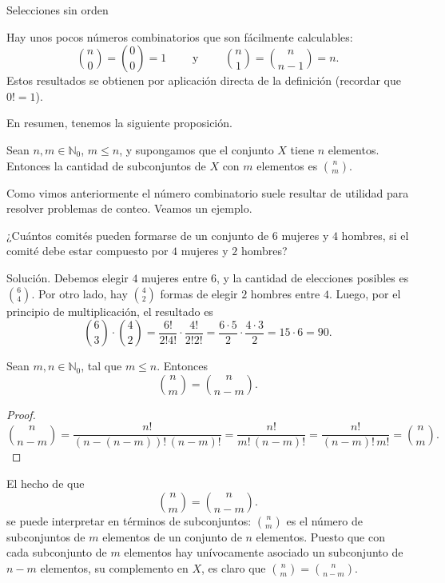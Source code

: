 \begin{section}{Selecciones sin orden}
\begin{observacion} Hay unos pocos números combinatorios que son fácilmente calculables: 
$$
\binom{n}{0} = \binom{0}{0} = 1 \qquad \text{ y }\qquad  \binom{n}{1} = \binom{n}{n-1} = n. 
$$
Estos resultados se obtienen por aplicación directa de la definición (recordar que  $0! =1$). 
\end{observacion}

En resumen, tenemos la siguiente proposición.

\begin{proposicion}
Sean $n, m \in \mathbb N_0$, $m \le n$, y supongamos que el conjunto $X$ tiene $n$ elementos.
Entonces la cantidad de subconjuntos de $X$ con $m$ elementos es
$
\displaystyle\binom{n}{m}
$.
\end{proposicion}

Como vimos anteriormente el número combinatorio suele resultar de utilidad para resolver pro\-ble\-mas de conteo. Veamos un ejemplo.

\begin{ejemplo}
 ¿Cuántos comités pueden formarse de un conjunto de $6$ mujeres y $4$ hombres, si el comité debe estar compuesto por $4$ mujeres y $2$ hombres?

{\sc Solución.} Debemos elegir $4$ mujeres entre $6$, y la cantidad de elecciones posibles es   $\binom{6}{4}$. Por otro lado, hay $ \binom{4}{2}$ formas de elegir $2$ hombres entre $4$. Luego, por el principio de multiplicación,  el resultado es
$$
\binom{6}{3}\cdot \binom{4}{2} = \frac{6!}{2!4!}\cdot\frac{4!}{2!2!} = \frac{6\cdot 5}{2}\cdot\frac{4\cdot 3}{2} = 15 \cdot 6 = 90.
$$
\end{ejemplo}




\begin{proposicion}\label{simcomb}
Sean $m,n \in \mathbb N_0$, tal que $m \le n$. Entonces
$$
\binom{n}{m} = \binom{n}{n-m}.
$$
\end{proposicion}
\begin{proof}
$$
\binom{n}{n-m} = \frac{n!}{(n-(n-m))!\,(n-m)!} =  \frac{n!}{m!\,(n-m)!} =   \frac{n!}{(n-m)!\,m!} = \binom{n}{m}.
$$
\end{proof}


\begin{nota}
El hecho  de que 
$$
\binom{n}{m} = \binom{n}{n-m}.
$$
se puede interpretar en términos de subconjuntos:  $\displaystyle\binom{n}{m}$ es el número de subconjuntos de $m$
ele\-men\-tos de un conjunto de $n$ elementos. Puesto que con cada subconjunto de $m$ ele\-men\-tos hay unívocamente asociado un subconjunto de $n - m$ elementos, su complemento en $X$, es claro que $\displaystyle\binom{n}{m} = \binom{n}{n-m}$.
\end{nota}


\end{section}
